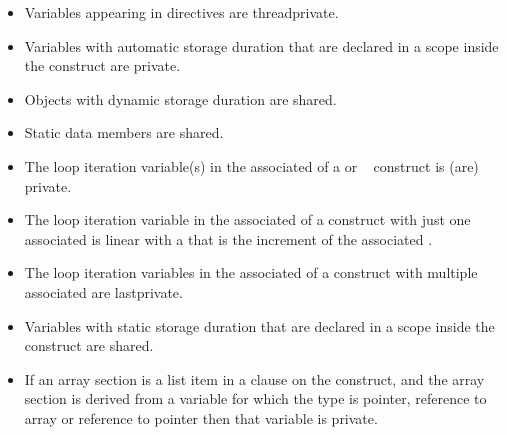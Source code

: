 \ccppspecificstart
\begin{itemize}
\item Variables appearing in  directives are threadprivate.

\item Variables with automatic storage duration that are declared in a scope inside the 
construct are private. 

\item Objects with dynamic storage duration are shared.

\item Static data members are shared.

\item The loop iteration variable(s) in the associated  of a  or 
~ construct is (are) private. 

\item The loop iteration variable in the associated  of a  construct with just 
one associated  is linear with a  that is the increment of 
the associated .

\item The loop iteration variables in the associated  of a  construct with 
multiple associated  are lastprivate. 

\item Variables with static storage duration that are declared in a scope inside the construct 
are shared.

\item If an array section is a list item in a  clause on the  construct, and the array section is derived from a variable for which the type is pointer, reference to array or reference to pointer then that variable is private. 
\end{itemize}
\ccppspecificend

